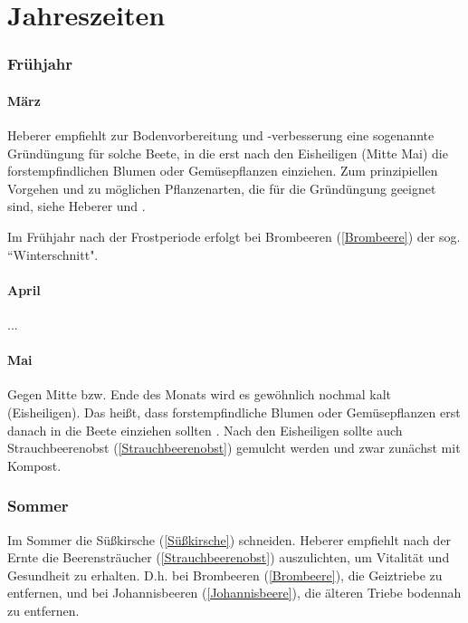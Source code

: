 \part{Jahreszeiten}

\section{Frühjahr}

\subsection{März}
\label{Mai}
Heberer \cite[S.~11]{Heberer2018} empfiehlt zur Bodenvorbereitung und -verbesserung eine sogenannte Gründüngung für solche Beete, in die erst nach den Eisheiligen (Mitte Mai) die forstempfindlichen Blumen oder Gemüsepflanzen einziehen.
Zum prinzipiellen Vorgehen und zu möglichen Pflanzenarten, die für die Gründüngung geeignet sind, siehe Heberer \cite[S.~11]{Heberer2018} und \cite[S.~114f]{Heberer2018}.

Im Frühjahr nach der Frostperiode erfolgt bei Brombeeren (\ref{Brombeere}) der sog. ``Winterschnitt".

\subsection{April}

...

\subsection{Mai}

Gegen Mitte bzw. Ende des Monats wird es gewöhnlich nochmal kalt (Eisheiligen).
Das heißt, dass forstempfindliche Blumen oder Gemüsepflanzen erst danach in die Beete einziehen sollten \cite[S.~11]{Heberer2018}.
Nach den Eisheiligen sollte auch \textrightarrow Strauchbeerenobst (\ref{Strauchbeerenobst}) gemulcht werden und zwar zunächst mit Kompost.

\section{Sommer}

Im Sommer die Süßkirsche (\ref{Süßkirsche}) schneiden.
Heberer \cite[S.~11]{Heberer2018} empfiehlt nach der Ernte die Beerensträucher (\ref{Strauchbeerenobst}) auszulichten, um Vitalität und Gesundheit zu erhalten.
D.h. bei Brombeeren (\ref{Brombeere}), die Geiztriebe zu entfernen, und bei Johannisbeeren (\ref{Johannisbeere}), die älteren Triebe bodennah zu entfernen.

